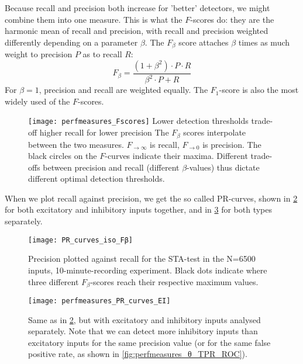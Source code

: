 Because recall and precision both increase for 'better' detectors, we might combine them into one measure. This is what the $F$-scores do: they are the harmonic mean of recall and precision, with recall and precision weighted differently depending on a parameter $β$. The $F_β$ score attaches $β$ times as much weight to precision $P$ as to recall $R$:
\begin{equation}
    F_β = \frac{(1+β^2) · P · R}{β^2 · P + R}
\end{equation}
For $β = 1$, precision and recall are weighted equally. The $F_1$-score is also the most widely used of the $F$-scores.


\begin{figure}
    \texttt{[image: perfmeasures\_Fscores]}
    \captionn
        {Lower detection thresholds trade-off higher recall for lower precision}
        {The $F_β$ scores interpolate between the two measures. $F_{→∞}$ is recall, $F_{→0}$ is precision. The black circles on the $F$-curves indicate their maxima. Different trade-offs between precision and recall (different $β$-values) thus dictate different optimal detection thresholds.}
    \label{fig:perfmeasures_Fscores}
\end{figure}

When we plot recall against precision, we get the so called PR-curves, shown in \cref{fig:PR_curves_iso_Fβ} for both excitatory and inhibitory inputs together, and in \cref{fig:perfmeasures_PR_curves_EI} for both types separately.

\begin{figure}
    \texttt{[image: PR\_curves\_iso\_Fβ]}
    \caption{Precision plotted against recall for the STA-test in the N=6500 inputs, 10-minute-recording experiment. Black dots indicate where three different $F_β$-scores reach their respective maximum values.}
    \label{fig:PR_curves_iso_Fβ}
\end{figure}

\begin{figure}
    \texttt{[image: perfmeasures\_PR\_curves\_EI]}
    \caption{Same as in \cref{fig:PR_curves_iso_Fβ}, but with excitatory and inhibitory inputs analysed separately. Note that we can detect more inhibitory inputs than excitatory inputs for the same precision value (or for the same false positive rate, as shown in \cref{fig:perfmeasures_θ_TPR_ROC}).}
    \label{fig:perfmeasures_PR_curves_EI}
\end{figure}


